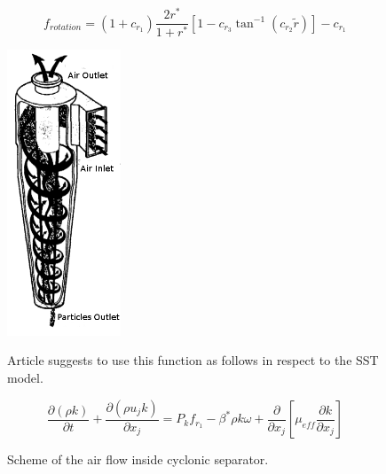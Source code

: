 \documentclass[a4paper]{jpconf}
\begin{document}
\begin{equation}
\label{eq:1}
f_{rotation} = (1+c_{r_1}) \frac{2r^*}{1+r^*} [1-c_{r_3}\tan^{-1}(c_{r_2}\tilde{r})] -c_{r_1}
\end{equation}
\begin{figure}[h]
\begin{minipage}{14pc}
\includegraphics[width=8pc]{flowScheme1.png}\hspace{6pc}
\caption{\label{fig:physicalModel}Scheme of the air flow inside cyclonic separator.}
\end{minipage}
\begin{minipage}{20pc}
Article \cite{Smirnov} suggests to use this function as follows in respect to the SST model.

\begin{equation}
\label{eq:2}
\frac{\partial (\rho k)}{\partial t} + \frac{\partial (\rho u_j k)}{\partial x_j} = P_k f_{r_1} - \beta^* \rho k \omega + \frac{\partial}{\partial x_j} \left[ \mu_{eff}\frac{\partial k}{\partial x_j} \right]
\end{equation}


\end{minipage}
\end{figure}
\end{document}
